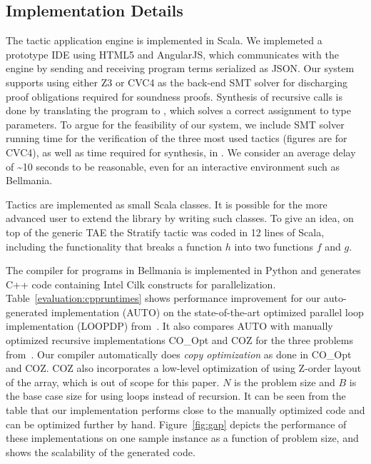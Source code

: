 \subsection{Implementation Details}
The tactic application engine is implemented in Scala. We implemeted a prototype
IDE using HTML5 and AngularJS, which communicates with the engine by sending
and receiving program terms serialized as JSON. Our system supports using either
Z3 or CVC4 as the back-end SMT solver for discharging proof obligations required
for soundness proofs. Synthesis of recursive calls is done by translating the
program to \Sketch{}, which solves a correct assignment to type parameters.
To argue for the feasibility of our system, we include
SMT solver running time for the verification of the three most used tactics (figures are for CVC4),
as well as time required for \Sketch{} synthesis, in .
We consider an average delay of \textasciitilde 10 seconds to be reasonable, even for an interactive
environment such as Bellmania.

Tactics are implemented as small Scala classes. It is possible for
the more advanced user to extend the library by writing such classes.
To give an idea, on top of the generic TAE the {\sf Stratify} tactic was coded in 12 lines of Scala,
including the functionality that breaks a function $h$ into two functions $f$ and $g$.

The compiler for programs in Bellmania is implemented in 
Python and generates C++ code containing Intel Cilk constructs for parallelization.
Table~\ref{evaluation:cppruntimes} shows performance improvement for our 
auto-generated implementation (AUTO) on the state-of-the-art optimized parallel
loop implementation (LOOPDP) from~\cite{IPDPS15/Tithi}. It also compares AUTO with manually 
optimized recursive implementations CO\_Opt and COZ for the three problems from~\cite{IPDPS15/Tithi}. 
Our compiler automatically does \textit{copy optimization} 
as done in CO\_Opt and COZ. COZ also incorporates a low-level 
optimization of using Z-order layout of the array,
which is out of scope for this paper. %
$N$ is the problem size and $B$ is the base case size for using loops 
instead of recursion. It can be seen from the table that our implementation 
performs close to the manually optimized code and can be optimized further by 
hand. Figure~\ref{fig:gap} depicts the performance of these implementations 
on one sample instance
as a function of problem size, and shows the scalability of the generated code. 

